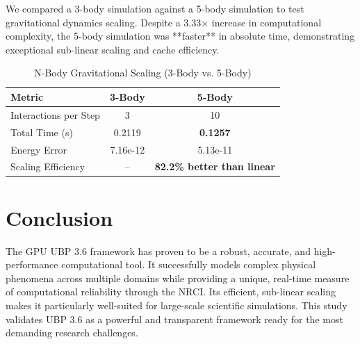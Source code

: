 \documentclass[10pt, a4paper]{article}
\begin{document}
We compared a 3-body simulation against a 5-body simulation to test gravitational dynamics scaling. Despite a 3.33× increase in computational complexity, the 5-body simulation was **faster** in absolute time, demonstrating exceptional sub-linear scaling and cache efficiency.

\begin{table}[h!]
    \centering
    \caption{N-Body Gravitational Scaling (3-Body vs. 5-Body)}
    \begin{tabular}{lcc}
        \toprule
        \textbf{Metric} & \textbf{3-Body} & \textbf{5-Body} \\
        \midrule
        Interactions per Step & 3 & 10 \\
        Total Time (s) & 0.2119 & \textbf{0.1257} \\
        Energy Error & 7.16e-12 & 5.13e-11 \\
        Scaling Efficiency & -- & \textbf{82.2\% better than linear} \\
        \bottomrule
    \end{tabular}
\end{table}

\section{Conclusion}

The GPU UBP 3.6 framework has proven to be a robust, accurate, and high-performance computational tool. It successfully models complex physical phenomena across multiple domains while providing a unique, real-time measure of computational reliability through the NRCI. Its efficient, sub-linear scaling makes it particularly well-suited for large-scale scientific simulations. This study validates UBP 3.6 as a powerful and transparent framework ready for the most demanding research challenges.
\end{document}
